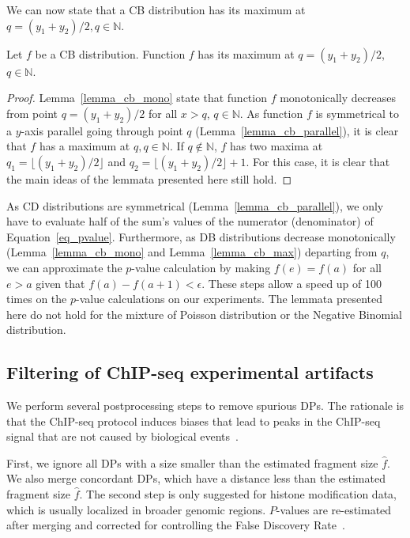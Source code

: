 \noindent
We can now state that a CB distribution has its maximum at $q = (y_1 + y_2)/2, q\in \mathbb{N}$.
\begin{mylemma}
 Let $f$ be a CB distribution. Function $f$ has its maximum at $q = (y_1 + y_2)/2$, $q \in \mathbb{N}$.
\label{lemma_cb_max}
\end{mylemma}
\begin{proof}
 Lemma~\ref{lemma_cb_mono} state that function $f$ monotonically decreases from point $q = (y_1 + y_2)/2$ for all $x>q$, $q \in \mathbb{N}$.
 As function $f$ is symmetrical to a $y$-axis parallel going through point $q$ (Lemma~\ref{lemma_cb_parallel}), it is clear that $f$ has a maximum at $q, q \in \mathbb{N}$.
 If $q \notin \mathbb{N}$, $f$ has two maxima at $q_1 = \lfloor (y_1 + y_2)/2 \rfloor$ and $ q_2 = \lfloor(y_1 + y_2)/2 \rfloor+1$.
 For this case, it is clear that the main ideas of the lemmata presented here still hold.
\end{proof}

\noindent
As CD distributions are symmetrical (Lemma~\ref{lemma_cb_parallel}), we only have to evaluate half of the sum's values of the numerator (denominator) of Equation~\ref{eq_pvalue}.
Furthermore, as DB distributions decrease monotonically (Lemma~\ref{lemma_cb_mono} and Lemma~\ref{lemma_cb_max}) departing from $q$, we can approximate the $p$-value calculation by making $f(e)=f(a)$ for all $e>a$ given that $f(a)-f(a+1) < \epsilon$. 
These steps allow a speed up of 100 times on the $p$-value calculations on our experiments. 
The lemmata presented here do not hold for the mixture of Poisson distribution or the Negative Binomial distribution. %


\subsection{Filtering of ChIP-seq experimental artifacts}
\label{sec_method_artefacts}
We perform several postprocessing steps to remove spurious DPs.
The rationale is that the ChIP-seq protocol induces biases that lead to peaks in the ChIP-seq signal that are not caused by biological events~\citep{Pepke2009}.

First, we ignore all DPs with a size smaller than the estimated fragment size $\hat{f}$. 
We also merge concordant DPs, which have a distance less than the estimated fragment size $\hat{f}$. 
The second step is only suggested for histone modification data, which is usually localized in broader genomic regions. 
$P$-values are re-estimated after merging and corrected for controlling the False Discovery Rate~\citep{Benjamini1995}.

